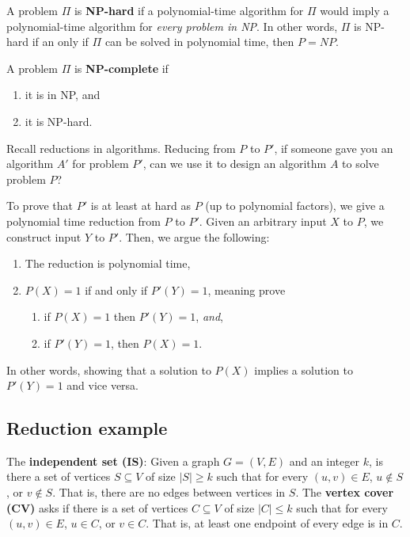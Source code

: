 \documentclass[titlepage, 12pt, leqno]{article}
\begin{document}
\begin{definition}
    A problem $\Pi$ is \textbf{NP-hard} if a polynomial-time algorithm for
    $\Pi$ would imply a polynomial-time algorithm for \textit{every problem in
    NP}. In other words, $\Pi$ is NP-hard if an only if $\Pi$ can be solved in
    polynomial time, then $P = NP$.
\end{definition}

\begin{definition}
    A problem $\Pi$ is \textbf{NP-complete} if
    \begin{enumerate}
        \item it is in NP, and
        \item it is NP-hard.
    \end{enumerate}
\end{definition}

Recall reductions in algorithms. Reducing from $P$ to $P'$, if someone gave you
an algorithm $A'$ for problem $P'$, can we use it to design an algorithm $A$ to
solve problem $P$?

To prove that $P'$ is at least at hard as $P$ (up to polynomial factors), we 
give a polynomial time reduction from $P$ to $P'$. Given an arbitrary input $X$
to $P$, we construct input $Y$ to $P'$. Then, we argue the following: 
\begin{enumerate}
    \item The reduction is polynomial time,
    \item $P(X) = 1$ if and only if $P'(Y) = 1$, meaning prove
        \begin{enumerate}
            \item if $P(X) = 1$ then $P'(Y) = 1$, \textit{and},
            \item if $P'(Y) = 1$, then $P(X) = 1$.
        \end{enumerate}
\end{enumerate}
In other words, showing that a solution to $P(X)$ implies a solution to $P'(Y)
= 1$ and vice versa.

\subsection{Reduction example}
The \textbf{independent set (IS)}: Given a graph $G = (V,E)$ and an integer
$k$, is there a set of vertices $S \subseteq V$ of size $|S| \ge k$ such that
for every $(u,v) \in E$, $u \notin S$, or $v \notin S$. That is, there are no
edges between vertices in $S$. The \textbf{vertex cover (CV)} asks if there is a
set of vertices $C \subseteq V$ of size $|C| \le k$ such that for every $(u,v)
\in E$, $u \in C$, or $v \in C$. That is, at least one endpoint of every edge is
in $C$. 
\end{document}

